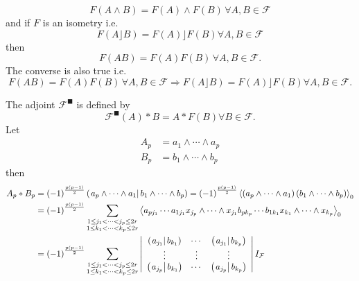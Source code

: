 \documentclass[aps,preprint]{revtex4}%
\begin{document}
\begin{equation}
F\left(  A\wedge B\right)  =F\left(  A\right)  \wedge F\left(  B\right)
\,\forall A,B\in\mathcal{F}%
\end{equation}
and if $F$ is an isometry i.e.
\begin{equation}
F\left(  A\rfloor B\right)  =F\left(  A\right)  \rfloor F\left(  B\right)
\forall A,B\in\mathcal{F}%
\end{equation}
then
\begin{equation}
F\left(  AB\right)  =F\left(  A\right)  F\left(  B\right)  \,\forall
A,B\in\mathcal{F}.
\end{equation}
The converse is also true i.e.
\begin{equation}
F\left(  AB\right)  =F\left(  A\right)  F\left(  B\right)  \,\forall
A,B\in\mathcal{F\Rightarrow}F\left(  A\rfloor B\right)  =F\left(  A\right)
\rfloor F\left(  B\right)  \forall A,B\in\mathcal{F}.
\end{equation}


The adjoint $\mathcal{F}^{\blacksquare}$ is defined by%
\begin{equation}
\mathcal{F}^{\blacksquare}\left(  A\right)  \ast B=A\ast F\left(  B\right)
\forall B\in\mathcal{F}.
\end{equation}
Let
\begin{align}
A_{p}  &  =a_{1}\wedge\cdots\wedge a_{p}\\
B_{p}  &  =b_{1}\wedge\cdots\wedge b_{p}%
\end{align}
then
\begin{align}
A_{p}\ast B_{p}  &  =\left(  -1\right)  ^{\frac{p\left(  p-1\right)  }{2}%
}\left(  \left.  a_{p}\wedge\cdots\wedge a_{1}\right\vert b_{1}\wedge
\cdots\wedge b_{p}\right)  =\left(  -1\right)  ^{\frac{p\left(  p-1\right)
}{2}}\left\langle \left(  a_{p}\wedge\cdots\wedge a_{1}\right)  \left(
b_{1}\wedge\cdots\wedge b_{p}\right)  \right\rangle _{0}\\
&  =\left(  -1\right)  ^{\frac{p\left(  p-1\right)  }{2}}\sum_{\substack{1\leq
j_{1}<\cdots<j_{p}\leq2r\\1\leq k_{1}<\cdots<k_{p}\leq2r}}\left\langle
a_{pj_{1}}\cdots a_{1j_{1}}x_{j_{p}}\wedge\cdots\wedge x_{j_{1}}b_{pk_{p}%
}\cdots b_{1k_{1}}x_{k_{1}}\wedge\cdots\wedge x_{k_{p}}\right\rangle _{0}\\
&  =\left(  -1\right)  ^{\frac{p\left(  p-1\right)  }{2}}\sum_{\substack{1\leq
j_{1}<\cdots<j_{p}\leq2r\\1\leq k_{1}<\cdots<k_{p}\leq2r}}\left\vert
\begin{array}
[c]{ccc}%
\left(  \left.  a_{j_{1}}\right\vert b_{k_{1}}\right)  & \cdots & \left(
\left.  a_{j_{1}}\right\vert b_{k_{p}}\right) \\
\vdots & \vdots & \vdots\\
\left(  \left.  a_{j_{p}}\right\vert b_{k_{1}}\right)  & \cdots & \left(
\left.  a_{j_{p}}\right\vert b_{k_{p}}\right)
\end{array}
\right\vert I_{\mathcal{F}}%
\end{align}
\end{document}
